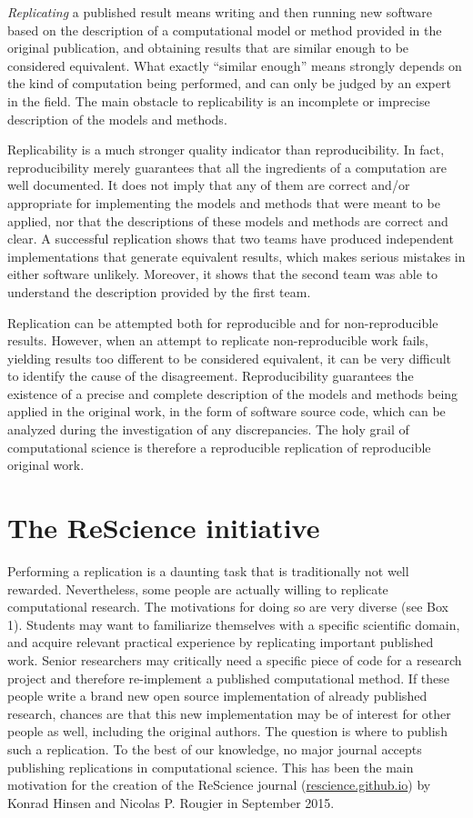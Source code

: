 \documentclass[a4paper,10pt, twocolumn]{article}
\begin{document}
\textit{Replicating} a published result means writing and then running
new software based on the description of a computational model or
method provided in the original publication, and obtaining results
that are similar enough to be considered equivalent. What exactly
``similar enough'' means strongly depends on the kind of computation
being performed, and can only be judged by an expert in the field.
The main obstacle to replicability is an incomplete or imprecise
description of the models and methods.

Replicability is a much stronger quality indicator than
reproducibility. In fact, reproducibility merely guarantees that all
the ingredients of a computation are well documented. It does not
imply that any of them are correct and/or appropriate for implementing
the models and methods that were meant to be applied, nor that the
descriptions of these models and methods are correct and clear. A
successful replication shows that two teams have produced independent
implementations that generate equivalent results, which makes serious
mistakes in either software unlikely. Moreover, it shows that the
second team was able to understand the description provided by the
first team.

Replication can be attempted both for reproducible and for
non-reproducible results. However, when an attempt to replicate
non-reproducible work fails, yielding results too different to be
considered equivalent, it can be very difficult to identify the cause
of the disagreement. Reproducibility guarantees the existence of a
precise and complete description of the models and methods being
applied in the original work, in the form of software source code,
which can be analyzed during the investigation of any
discrepancies. The holy grail of computational science is therefore a
reproducible replication of reproducible original work.

\section*{The ReScience initiative}

Performing a replication is a daunting task that is traditionally not well
rewarded. Nevertheless, some people are actually willing to replicate
computational research. The motivations for doing so are very diverse (see Box 1). Students may want to familiarize themselves with
a specific scientific domain, and acquire relevant practical experience by replicating important published work. Senior researchers may critically
need a specific piece of code for a research project and therefore re-implement a published computational method. If these people write a brand new
open source implementation of already published research, chances are that this new
implementation may be of interest for other people as well, including
the original authors. The question is where to publish such a replication. To the
best of our knowledge, no major journal accepts publishing replications in computational science. This has been the main motivation for the
creation of the ReScience journal (\href{https://rescience.github.io}{rescience.github.io}) by Konrad Hinsen and Nicolas P. Rougier in September 2015.\\
\end{document}
